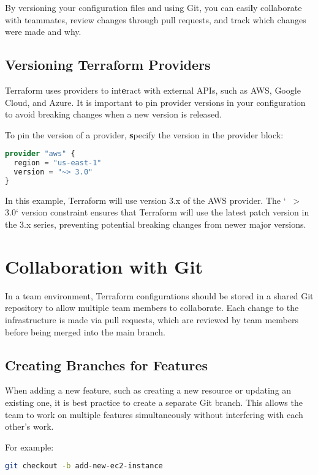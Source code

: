 By versioning your configuration files and using Git, you can easi\textbf{l}y collaborate with teammates, review changes through pull requests, and track which changes were made and why.

\subsection{Versioning Terraform Providers}

Terraform uses providers to int\textbf{e}ract with external APIs, such as AWS, Google Cloud, and Azure. It is important to pin provider versions in your configuration to avoid breaking changes when a new version is released.

To pin the version of a provider, \textbf{s}pecify the version in the provider block:

\begin{lstlisting}[language=terraform]
provider "aws" {
  region = "us-east-1"
  version = "~> 3.0"
}
\end{lstlisting}

In this example, Terraform will use version 3.x of the AWS provider. The `~ > 3.0` version constraint ensures that Terraform will use the latest patch version in the 3.x series, preventing potential breaking changes from newer major versions.

\section{Collaboration with Git}

In a team environment, Terraform configurations should be stored in a shared Git repository to allow multiple team members to collaborate. Each change to the infrastructure is made via pull requests, which are reviewed by team members before being merged into the main branch.

\subsection{Creating Branches for Features}

When adding a new feature, such as creating a new resource or updating an existing one, it is best practice to create a separate Git branch. This allows the team to work on multiple features simultaneously without interfering with each other's work.

For example:

\begin{lstlisting}[language=bash]
git checkout -b add-new-ec2-instance
\end{lstlisting}

